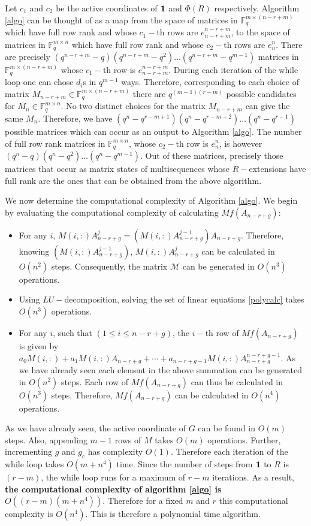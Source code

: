 \documentclass[letterpaper, 12 pt]{article}  \usepackage{amssymb}
\newcommand{\F}{\mathbb{F}}
\begin{document}
Let $c_1$ and $c_2$ be the active coordinates of ${\bf 1}$
and $\Phi(R)$ respectively. Algorithm \ref{algo} can be thought of as a map from the space of
matrices in $\F_q^{m \times (n-r+m)}$ which have full row rank and whose
$c_1-$th rows are $e_{n-r+m}^{n-r+m}$, to the space of matrices in $ \F_q^{m
\times n}$ which have full row rank and whose $c_2-$th rows are $e_n^n$.  There are precisely $ (q^{n-r+m}-q)(q^{n-r+m}-q^2)\ldots(q^{n-r+m}-q^{m-1})$
matrices in $\F_q^{m \times (n-r+m)}$ whose $c_1-$th row
is $e_{n-r+m}^{n-r+m}$. During each iteration of the while loop one can chose $d_i$s 
in $q^{m-1}$ ways. Therefore, corresponding to each choice of matrix $M_{n-r+m} \in \F_q^{m \times (n-r+m)}$ there are $q^{(m-1)(r-m)}$
possible candidates for $M_n \in \F_q^{m \times n}$. No two distinct choices for the matrix $M_{n-r+m}$ can give the
same $M_n$. Therefore, we have $
(q^n-q^{r-m+1})(q^n - q^{r-m+2})\ldots(q^n -q^{r-1})$ possible matrices which
can occur as an output to Algorithm \ref{algo}. The
number of full row rank matrices in $\F_q^{m \times n} $, whose $c_2-$th row is
$e_n^n$, is however $(q^n - q)(q^{n}-q^2)\ldots(q^{n}-q^{m-1})$.
Out of these matrices, precisely those matrices that occur as matrix
states of multisequences whose $R-$extensions have full rank are the ones that can be obtained from the above algorithm.

We now determine the computational complexity of Algorithm
\ref{algo}. We begin by evaluating the computational complexity of calculating
$Mf(A_{n-r+g})$: 

\begin{itemize}
 \item For any $i$, $M(i,:)A_{n-r+g}^j = (M(i,:)A_{n-r+g}^{j-1})A_{n-r+g}$.
Therefore, knowing $(M(i,:)A_{n-r+g}^{j-1})$, $M(i,:)A_{n-r+g}^j$ can
be calculated in $O(n^2)$ steps. Consequently, the matrix $\mathscr{M}$ can be
generated in $O(n^3)$ operations.
\item Using $LU-$decomposition, solving the set of linear equations
\eqref{polycalc} takes $O(n^3)$ operations.
\item For any $i$, such that $(1\leq i \leq n-r+g)$, the $i-$th
row of $Mf(A_{n-r+g})$ is given by $a_0M(i,:) + a_1M(i,:)A_{n-r+g} + \cdots +
a_{n-r+g-1}M(i,:)A_{n-r+g}^{n-r+g-1} $. As we have already seen each element in
the above summation can be generated in $O(n^2)$ steps. Each row of
$Mf(A_{n-r+g})$ can thus be calculated in $O(n^3)$ steps. Therefore, 
$Mf(A_{n-r+g})$ can be calculated in $O(n^4)$ operations.
\end{itemize}
As we have already seen, the active coordinate of $G$ can be found in $O(m)$
steps. Also, appending  $m-1$ rows of $M$ takes $O(m)$ operations. Further,
incrementing $g$ and $g_c$ has complexity $O(1)$. Therefore each iteration of the
while loop takes $O(m+n^4)$ time.  Since the number of steps from ${\bf 1}$ to
$R$ is $(r-m)$, the while loop runs for a maximum of $r-m$ iterations.
 As a result, {\bf the computational complexity of algorithm \ref{algo} is
$O((r-m)(m+n^4))$}.
 Therefore for a fixed $m$ and $r$ this computational complexity is $O(n^4)$. This is therefore a polynomial time algorithm.    
\end{document}
